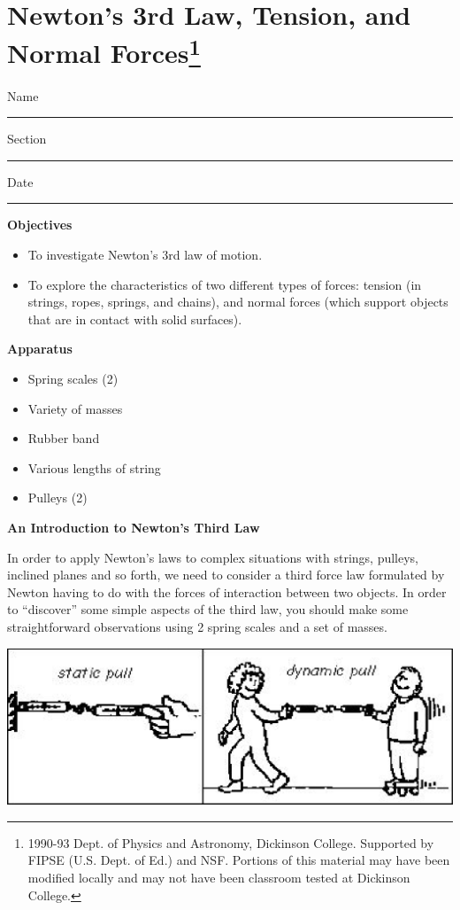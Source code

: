 
\section{Newton's 3rd Law, Tension, and Normal Forces\footnote{
1990-93 Dept. of Physics and Astronomy, Dickinson College. Supported by FIPSE
(U.S. Dept. of Ed.) and NSF. Portions of this material may have been modified
locally and may not have been classroom tested at Dickinson College.
}}

Name \rule{2.0in}{0.1pt}\hfill{}Section \rule{1.0in}{0.1pt}\hfill{}Date \rule{1.0in}{0.1pt}

\textbf{Objectives }

\begin{itemize}
\item To investigate Newton's 3rd law of motion. 
\item To explore the characteristics of two different types of forces: tension
(in strings, ropes, springs, and chains), and normal forces (which support objects
that are in contact with solid surfaces).
\end{itemize}
\textbf{Apparatus} 

\begin{itemize}
\item Spring scales (2) 
\item Variety of masses 
\item Rubber band 
\item Various lengths of string 
\item Pulleys (2)
\end{itemize}
\textbf{An Introduction to Newton's Third Law }

In order to apply Newton's laws to complex situations with strings, pulleys,
inclined planes and so forth, we need to consider a third force law formulated
by Newton having to do with the forces of interaction between two objects. In
order to ``discover'' some simple aspects of the third law,
you should make some straightforward observations using 2 spring scales and
a set of masses.

\vspace{0.3cm}
{\par\centering \includegraphics{newton_fig1.eps} \par}
\vspace{0.3cm}

